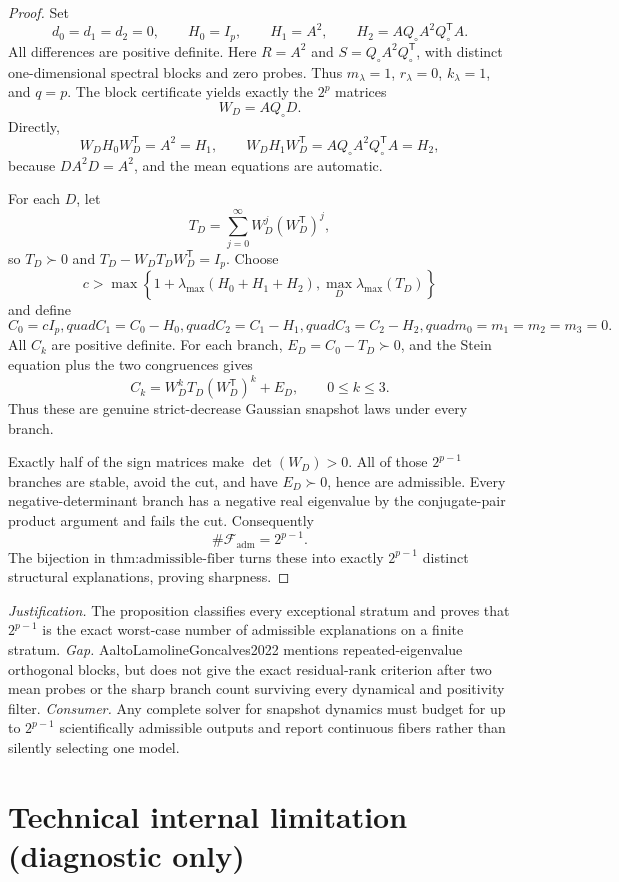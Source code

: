\documentclass{article}
\begin{document}
\begin{proof}
Set
\[
 d_0=d_1=d_2=0,\qquad H_0=I_p,\qquad H_1=A^2,\qquad
 H_2=AQ_\circ A^2Q_\circ^{\mathsf T}A.
\]
All differences are positive definite.  Here \(R=A^2\) and \(S=Q_\circ A^2Q_\circ^{\mathsf T}\), with distinct one-dimensional spectral blocks and zero probes.  Thus \(m_\lambda=1\), \(r_\lambda=0\), \(k_\lambda=1\), and \(q=p\).  The block certificate yields exactly the \(2^p\) matrices
\[
 W_D=AQ_\circ D.
\]
Directly,
\[
 W_DH_0W_D^{\mathsf T}=A^2=H_1,\qquad
 W_DH_1W_D^{\mathsf T}=AQ_\circ A^2Q_\circ^{\mathsf T}A=H_2,
\]
because \(DA^2D=A^2\), and the mean equations are automatic.

For each \(D\), let
\[
 T_D=\sum_{j=0}^{\infty}W_D^j(W_D^{\mathsf T})^j,
\]
so \(T_D\succ0\) and \(T_D-W_DT_DW_D^{\mathsf T}=I_p\).  Choose
\[
 c>\max\left\{1+\lambda_{\max}(H_0+H_1+H_2),
 \max_D\lambda_{\max}(T_D)\right\}
\]
and define
\[
 C_0=cI_p,quad C_1=C_0-H_0,quad C_2=C_1-H_1,quad
 C_3=C_2-H_2,quad m_0=m_1=m_2=m_3=0.
\]
All \(C_k\) are positive definite.  For each branch, \(E_D=C_0-T_D\succ0\), and the Stein equation plus the two congruences gives
\[
 C_k=W_D^kT_D(W_D^{\mathsf T})^k+E_D,\qquad 0\leq k\leq3.
\]
Thus these are genuine strict-decrease Gaussian snapshot laws under every branch.

Exactly half of the sign matrices make \(\det(W_D)>0\).  All of those \(2^{p-1}\) branches are stable, avoid the cut, and have \(E_D\succ0\), hence are admissible.  Every negative-determinant branch has a negative real eigenvalue by the conjugate-pair product argument and fails the cut.  Consequently
\[
 \#\mathcal F_{\mathrm{adm}}=2^{p-1}.
\]
The bijection in \(\text{thm:admissible-fiber}\) turns these into exactly \(2^{p-1}\) distinct structural explanations, proving sharpness.
\end{proof}
\par\smallskip\noindent \textit{Justification.} The proposition classifies every exceptional stratum and proves that \(2^{p-1}\) is the exact worst-case number of admissible explanations on a finite stratum. \textit{Gap.} AaltoLamolineGoncalves2022 mentions repeated-eigenvalue orthogonal blocks, but does not give the exact residual-rank criterion after two mean probes or the sharp branch count surviving every dynamical and positivity filter. \textit{Consumer.} Any complete solver for snapshot dynamics must budget for up to \(2^{p-1}\) scientifically admissible outputs and report continuous fibers rather than silently selecting one model.

\section*{Technical internal limitation (diagnostic only)}
\end{document}
